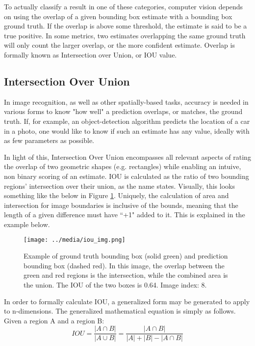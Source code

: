 To actually classify a result in one of these categories, computer vision depends on using the overlap of a given bounding box estimate with a bounding box ground truth. If the overlap is above some threshold, the estimate is said to be a true positive. In some metrics, two estimates overlapping the same ground truth will only count the larger overlap, or the more confident estimate. Overlap is formally known as Intersection over Union, or IOU value.

\subsection{Intersection Over Union}
In image recognition, as well as other spatially-based tasks, accuracy is needed in various forms to know "how well" a prediction overlaps, or matches, the ground truth. If, for example, an object-detection algorithm predicts the location of a car in a photo, one would like to know if such an estimate has any value, ideally with as few parameters as possible.

In light of this, Intersection Over Union encompasses all relevant aspects of rating the overlap of two geometric shapes (e.g. rectangles) while enabling an intuive, non binary scoring of an estimate. IOU is calculated as the ratio of two bounding regions' intersection over their union, as the name states. Visually, this looks something like the below in Figure \ref{iou_img}. Uniquely, the calculation of area and intersection for image boundaries is inclusive of the bounds, meaning that the length of a given difference must have ``+1" added to it. This is explained in the example below.

\begin{figure}[ht] %
    \texttt{[image: ../media/iou\_img.png]}
    \caption{Example of ground truth bounding box (solid green) and prediction bounding box (dashed red). In this image, the overlap between the green and red regions is the intersection, while the combined area is the union. The IOU of the two boxes is 0.64. Image index: 8.}
    \label{iou_img} %
\end{figure}

In order to formally calculate IOU, a generalized form may be generated to apply to n-dimensions. The generalized mathematical equation is simply as follows. Given a region A and a region B: 
\begin{equation}
IOU = \frac{|A\cap B|}{|A\cup B|} = \frac{|A\cap B|}{|A|+|B|- |A\cap B|}
\end{equation}


